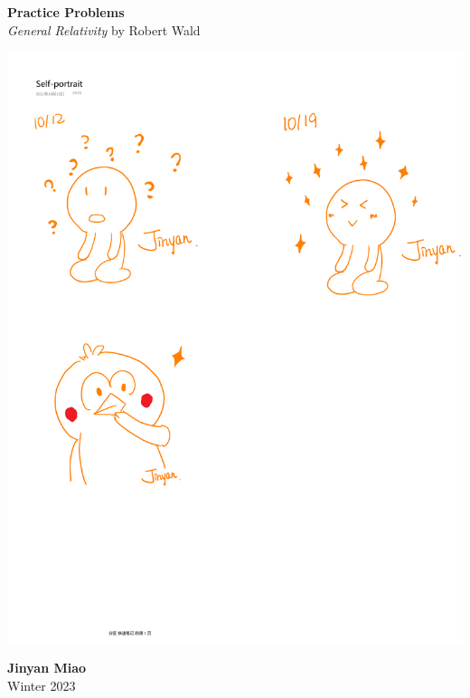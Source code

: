 \documentclass[11pt, onesided]{book}
\theoremstyle{break}
\theoremstyle{break}
\begin{document}
	\begin{titlepage}
		\begin{center}
			\vspace*{0.5cm}
			\Huge \color{red}
				\textbf{Practice Problems}\\
			\vspace{0.5cm}			
			\Large \color{black}
			\textit{General Relativity} by Robert Wald\\
			\vspace{1.5cm}

			\includegraphics[scale=1.15]{hmm.pdf}
			
			
			\vspace{2cm}
			\LARGE
				\textbf{Jinyan Miao}\\
				\hfill\break
				\LARGE Winter 2023\\
			\vspace{1cm}

		\vspace*{\fill}
		\end{center}			
	\end{titlepage}
\end{document}
